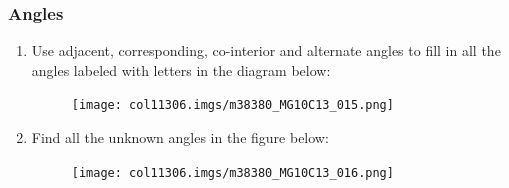 \begin{table}[H]
{\begin{mdframed}[linewidth=4, leftmargin=40, rightmargin=40]
\begin{exercise}
    \end{exercise}
    \end{mdframed}
    }
    \noindent
\vspace{-1cm}
  \label{m38380*secfhsst!!!underscore!!!id550}
        \subsubsection{ Angles }
        \nopagebreak
        \label{m38380*eip-407}\begin{enumerate}[noitemsep,
label=\textbf{\arabic*}. ] 
            \item Use adjacent, corresponding, co-interior and alternate angles
to fill in all the angles labeled with letters in the diagram below:

    \setcounter{subfigure}{0}


	\begin{figure}[H] %
    \begin{center}
   
\label{m38380*id317272!!!underscore!!!media}\label{
m38380*id317272!!!underscore!!!printimage}\texttt{[image: col11306.imgs/m38380\_MG10C13\_015.png]} %
        
      \vspace{2pt}
    \vspace{.1in}
    
    \end{center}

 \end{figure}   

    \addtocounter{footnote}{-0}
            \item Find all the unknown angles in the figure below:

    \setcounter{subfigure}{0}


	\begin{figure}[H] %
    \begin{center}
   
\label{m38380*id317298!!!underscore!!!media}\label{
m38380*id317298!!!underscore!!!printimage}\texttt{[image: 
col11306.imgs/m38380\_MG10C13\_016.png]} %
        
      \vspace{2pt}
    \vspace{.1in}
    
    \end{center}


\end{figure}
\end{enumerate}
\end{table}
